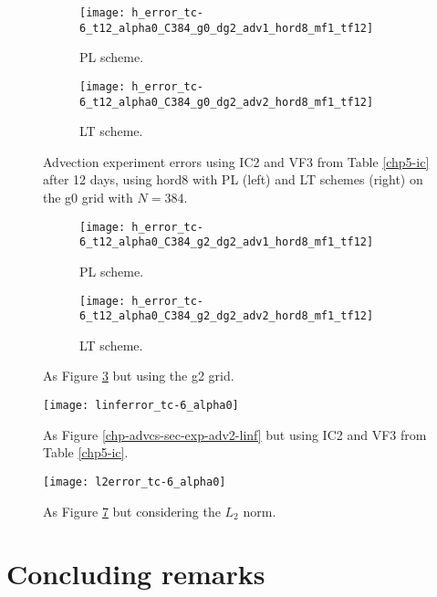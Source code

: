\newpage
\begin{figure}[!htb]
	\centering
	\begin{subfigure}{0.45\textwidth}
		\centering
		\texttt{[image: h\_error\_tc-6\_t12\_alpha0\_C384\_g0\_dg2\_adv1\_hord8\_mf1\_tf12]}
		\caption{PL scheme.\label{chp-advcs-sec-exp-adv4-errors-0a}}
	\end{subfigure}
	\begin{subfigure}{0.45\textwidth}
		\centering
		\texttt{[image: h\_error\_tc-6\_t12\_alpha0\_C384\_g0\_dg2\_adv2\_hord8\_mf1\_tf12]}
		\caption{LT scheme.\label{chp-advcs-sec-exp-adv4-errors-0b}}
	\end{subfigure}
	\caption{
	 Advection experiment errors using IC2 and VF3 from Table \ref{chp5-ic} after 12 days, using hord8
	 with PL (left) and LT schemes (right) on the g0 grid with $N=384$.
	 \label{chp-advcs-sec-exp-adv4-errors-0}}
\end{figure}
\begin{figure}[!htb]
	\centering
	\begin{subfigure}{0.45\textwidth}
		\centering
		\texttt{[image: h\_error\_tc-6\_t12\_alpha0\_C384\_g2\_dg2\_adv1\_hord8\_mf1\_tf12]}
		\caption{PL scheme.\label{chp-advcs-sec-exp-adv4-errors-2a}}
	\end{subfigure}
	\begin{subfigure}{0.45\textwidth}
		\centering
		\texttt{[image: h\_error\_tc-6\_t12\_alpha0\_C384\_g2\_dg2\_adv2\_hord8\_mf1\_tf12]}
		\caption{LT scheme.\label{chp-advcs-sec-exp-adv4-errors-2b}}
	\end{subfigure}
	\caption{As Figure \ref{chp-advcs-sec-exp-adv4-errors-0} but using the g2 grid.\label{chp-advcs-sec-exp-adv4-errors-2}}
\end{figure}



\newpage

\begin{figure}[!htb]
	\centering
	\texttt{[image: linferror\_tc-6\_alpha0]}
	\caption{As Figure \ref{chp-advcs-sec-exp-adv2-linf} but using  IC2 and VF3 from Table \ref{chp5-ic}.\label{chp-advcs-sec-exp-adv4-linf}}
\end{figure}

\begin{figure}[!htb]
	\centering
	\texttt{[image: l2error\_tc-6\_alpha0]}
	\caption{As Figure \ref{chp-advcs-sec-exp-adv4-linf} but considering the $L_2$ norm. \label{chp-advcs-sec-exp-adv4-error}}
\end{figure}

\newpage
\section{Concluding remarks}
\label{chp-cs-conc}